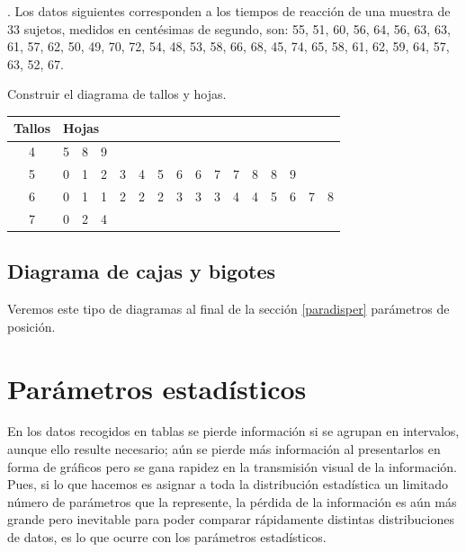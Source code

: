 \vspace{5mm}%

\begin{example}
	. Los datos siguientes corresponden a los tiempos de reacción de una muestra de $33$ sujetos, medidos en centésimas de segundo, son:
55, 51, 60, 56, 64, 56, 63, 63, 61, 57, 62, 50, 49, 70, 72, 54, 48, 53, 58, 66, 68, 45, 74, 65, 58, 61, 62, 59, 64, 57, 63, 52, 67.

\vspace{2mm} Construir el diagrama de tallos y hojas.

\begin{table}[H]
\centering
\begin{tabular}{c|ccccccccccccccc}
Tallos & \multicolumn{15}{l}{Hojas} \\ \hline
4 & 5 & 8 & 9 &  &  &  &  &  &  &  &  &  &  &  &  \\
5 & 0 & 1 & 2 & 3 & 4 & 5 & 6 & 6 & 7 & 7 & 8 & 8 & 9 &  &  \\
6 & 0 & 1 & 1 & 2 & 2 & 2 & 3 & 3 & 3 & 4 & 4 & 5 & 6 & 7 & 8 \\
7 & 0 & 2 & 4 &  &  &  &  &  &  &  &  &  &  &  & 
\end{tabular}
\end{table}
\end{example}


\subsection{Diagrama de cajas y bigotes}
Veremos este tipo de diagramas al final de la sección \ref{paradisper} parámetros de posición.




\section{Parámetros estadísticos}

En los datos recogidos en tablas se pierde información si se agrupan en intervalos, aunque ello resulte necesario; aún se pierde más información al presentarlos en forma de gráficos pero se gana rapidez en la transmisión visual de la información. Pues, si lo que hacemos es asignar a toda la distribución estadística un limitado número de parámetros que la represente, la pérdida de la información es aún más grande pero inevitable para poder comparar rápidamente distintas distribuciones de datos, es lo que ocurre con los parámetros estadísticos.

